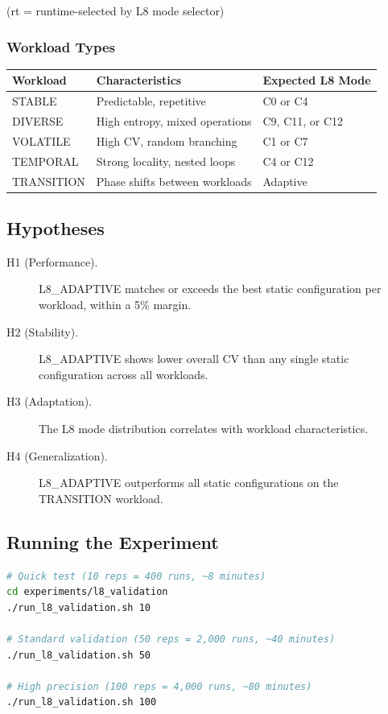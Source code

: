 (rt = runtime-selected by L8 mode selector)

\subsubsection{Workload Types}

\begin{center}
\begin{tabular}{lll}
\toprule
Workload    & Characteristics & Expected L8 Mode \\
\midrule
STABLE      & Predictable, repetitive            & C0 or C4 \\
DIVERSE     & High entropy, mixed operations     & C9, C11, or C12 \\
VOLATILE    & High CV, random branching          & C1 or C7 \\
TEMPORAL    & Strong locality, nested loops      & C4 or C12 \\
TRANSITION  & Phase shifts between workloads     & Adaptive \\
\bottomrule
\end{tabular}
\end{center}

\subsection{Hypotheses}

\begin{description}
  \item[H1 (Performance).] L8\_ADAPTIVE matches or exceeds the best static
        configuration per workload, within a 5\% margin.
  \item[H2 (Stability).] L8\_ADAPTIVE shows lower overall CV than any
        single static configuration across all workloads.
  \item[H3 (Adaptation).] The L8 mode distribution correlates with
        workload characteristics.
  \item[H4 (Generalization).] L8\_ADAPTIVE outperforms all static
        configurations on the TRANSITION workload.
\end{description}

\subsection{Running the Experiment}

\begin{lstlisting}[language=bash]
# Quick test (10 reps = 400 runs, ~8 minutes)
cd experiments/l8_validation
./run_l8_validation.sh 10

# Standard validation (50 reps = 2,000 runs, ~40 minutes)
./run_l8_validation.sh 50

# High precision (100 reps = 4,000 runs, ~80 minutes)
./run_l8_validation.sh 100
\end{lstlisting}

